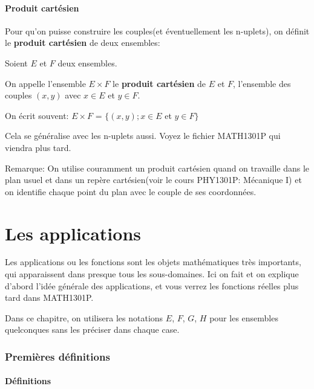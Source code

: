 \documentclass{article}
\begin{document}
\subsection{Produit cartésien}

Pour qu'on puisse construire les couples(et éventuellement les n-uplets), on définit le \textbf{produit cartésien} de deux ensembles:

\begin{tcolorbox}[colback=red!5!white,colframe=red!75!black,title=Définition 2.8]

Soient $E$ et $F$ deux ensembles. 

On appelle l'ensemble $E \times F$ le \textbf{produit cartésien} de $E$ et $F$, l'ensemble des couples $(x,y)$ avec $x \in E$ et $y \in F$.

On écrit souvent: $E \times F$ = $\{ (x,y); x \in E$ et $y \in F\}$
\tcblower

Cela se généralise avec les n-uplets aussi. Voyez le fichier MATH1301P qui viendra plus tard.

\end{tcolorbox}

Remarque: On utilise couramment un produit cartésien quand on travaille dans le plan usuel et dans un repère cartésien(voir le cours PHY1301P: Mécanique I) et on identifie chaque point du plan avec le couple de ses coordonnées.






\newpage
\part{Les applications}

Les applications ou les fonctions sont les objets mathématiques très importants, qui apparaissent dans presque tous les sous-domaines. Ici on fait et on explique d'abord l'idée générale des applications, et vous verrez les fonctions réelles plus tard dans MATH1301P.

Dans ce chapitre, on utilisera les notations $E$, $F$, $G$, $H$ pour les ensembles quelconques sans les préciser dans chaque case.


\section{Premières définitions}
\subsection{Définitions}
\end{document}
